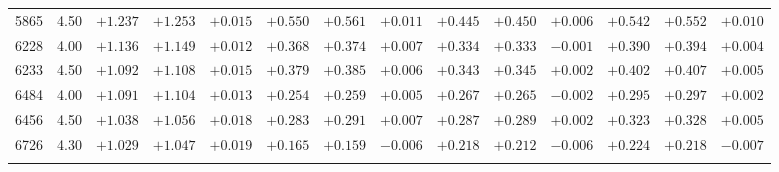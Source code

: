 \documentclass[]{aa}
\begin{document}
\begin{appendix}
\begin{table*}
\begin{center}
\begin{tabular}{llllllllllllll}
5865  &4.50 & $+1.237$ & $+1.253$ & $+0.015$ & $+0.550$ & $+0.561$ & $+0.011$ & $+0.445$ & $+0.450$ & $+0.006$ & $+0.542$ & $+0.552$ & $+0.010$ \\
6228  &4.00 & $+1.136$ & $+1.149$ & $+0.012$ & $+0.368$ & $+0.374$ & $+0.007$ & $+0.334$ & $+0.333$ & $-0.001$ & $+0.390$ & $+0.394$ & $+0.004$ \\
6233  &4.50 & $+1.092$ & $+1.108$ & $+0.015$ & $+0.379$ & $+0.385$ & $+0.006$ & $+0.343$ & $+0.345$ & $+0.002$ & $+0.402$ & $+0.407$ & $+0.005$ \\
6484  &4.00 & $+1.091$ & $+1.104$ & $+0.013$ & $+0.254$ & $+0.259$ & $+0.005$ & $+0.267$ & $+0.265$ & $-0.002$ & $+0.295$ & $+0.297$ & $+0.002$ \\
6456  &4.50 & $+1.038$ & $+1.056$ & $+0.018$ & $+0.283$ & $+0.291$ & $+0.007$ & $+0.287$ & $+0.289$ & $+0.002$ & $+0.323$ & $+0.328$ & $+0.005$ \\
6726  &4.30 & $+1.029$ & $+1.047$ & $+0.019$ & $+0.165$ & $+0.159$ & $-0.006$ & $+0.218$ & $+0.212$ & $-0.006$ & $+0.224$ & $+0.218$ & $-0.007$ \\
\hline\noalign{\smallskip}
\hline\noalign{\smallskip}
\end{tabular}
\end{center}
\end{table*}




\end{appendix}
\end{document}
